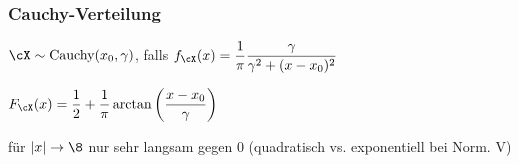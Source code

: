 \subsubsection{Cauchy-Verteilung}
\label{sec:cauchy-dist}
\shortdefinition $\cX \sim \text{Cauchy}(x_0, \gamma)$, falls $\displaystyle f_\cX(x) = \frac{1}{\pi} \frac{\gamma}{\gamma^2 + (x - x_0)^2}$

\shortremark[Verteilungsfunk.] $\displaystyle F_\cX(x) = \frac{1}{2} + \frac{1}{\pi} \arctan \left( \frac{x - x_0}{\gamma} \right)$

 für $|x| \rightarrow \8$ nur sehr langsam gegen $0$ (quadratisch vs. exponentiell bei Norm. V)
